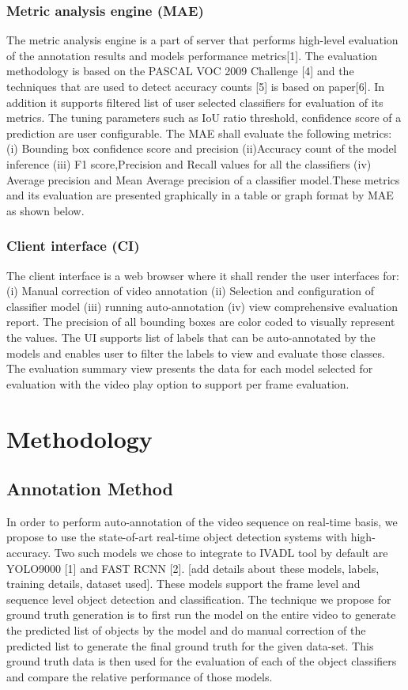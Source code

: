 \documentclass[conference]{IEEEtran}
\begin{document}
\subsubsection{Metric analysis engine (MAE)}
The metric analysis engine is a part of server that performs high-level evaluation of the annotation results and models performance metrics[1].  The evaluation methodology is based on the PASCAL VOC 2009 Challenge [4] and the techniques that are used to detect accuracy counts [5] is based on paper[6]. In addition it supports filtered list of user selected classifiers for evaluation of its metrics. The tuning parameters such as IoU ratio threshold, confidence score of a prediction are user configurable. The MAE shall evaluate the following metrics:
(i) Bounding box confidence score and precision (ii)Accuracy count of the model inference (iii) F1 score,Precision and Recall values for all the classifiers (iv) Average precision and Mean Average precision of a classifier model.These metrics and its evaluation are presented graphically in a table or graph format by MAE as shown below. 
\subsubsection{Client interface (CI)}
The client interface is a web browser where it shall render the user interfaces for: (i) Manual correction of video annotation (ii) Selection and configuration of classifier model (iii) running auto-annotation (iv) view comprehensive evaluation report. The precision of all bounding boxes are color coded to visually represent the values. The UI supports list of labels that can be auto-annotated by the models and enables user to filter the labels to view and evaluate those classes. The evaluation summary view presents the data for each model selected for evaluation with the video play option to support per frame evaluation. 


\section{Methodology}
\subsection{Annotation Method} \label{sec.annotation}
In order to perform auto-annotation of the video sequence on real-time basis, we propose to use the state-of-art real-time object detection systems with high-accuracy. Two such models we chose to integrate to IVADL tool by default are YOLO9000 [1] and FAST RCNN [2]. [add details about these models, labels, training details, dataset used]. These models support the frame level and sequence level object detection and classification. The technique we propose for ground truth generation is to first run the model on the entire video to generate the predicted list of objects by the model and do manual correction of the predicted list to generate the final ground truth for the given data-set. This ground truth data is then used for the evaluation of each of the object classifiers and compare the relative performance of those models. \par
\end{document}
